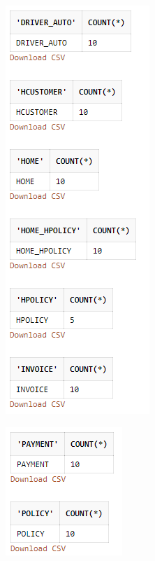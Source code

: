 \documentclass[12pt,english, openany]{book}
\begin{document}
\begin{figure}[H]
        \centering
        \includegraphics[scale=0.5]{f2.png}
\end{figure}
\begin{figure}[H]
        \centering
        \includegraphics[scale=0.5]{f3.png}
\end{figure}
\end{document}
